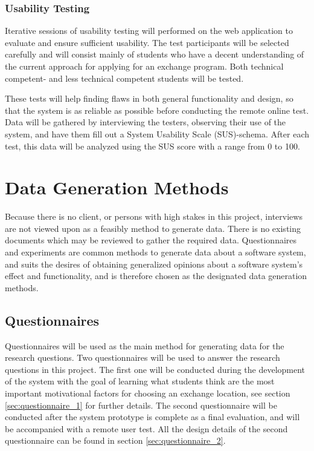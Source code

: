 \subsubsection{Usability Testing}

Iterative sessions of usability testing will performed on the web application to evaluate and ensure sufficient usability. The test participants will be selected carefully and will consist mainly of students who have a decent understanding of the current approach for applying for an exchange program. Both technical competent- and less technical competent students will be tested.

These tests will help finding flaws in both general functionality and design, so that the system is as reliable as possible before conducting the remote online test. Data will be gathered by interviewing the testers, observing their use of the system, and have them fill out a System Usability Scale (SUS)-schema\cite{brooke1996sus}. After each test, this data will be analyzed using the SUS score\cite{brooke1996sus} with a range from 0 to 100.

\section{Data Generation Methods}
Because there is no client, or persons with high stakes in this project, interviews are not viewed upon as a feasibly method to generate data. There is no existing documents which may be reviewed to gather the required data. Questionnaires and experiments are common methods to generate data about a software system\cite{oates2005researching}, and suits the desires of obtaining generalized opinions about a software system's effect and functionality, and is therefore chosen as the designated data generation methods. 

\subsection{Questionnaires}

Questionnaires will be used as the main method for generating data for the research questions. Two questionnaires will be used to answer the research questions in this project. The first one will be conducted during the development of the system with the goal of learning what students think are the most important motivational factors for choosing an exchange location, see section \ref{sec:questionnaire_1} for further details. The second questionnaire will be conducted after the system prototype is complete as a final evaluation, and will be accompanied with a remote user test. All the design details of the second questionnaire can be found in section \ref{sec:questionnaire_2}.

